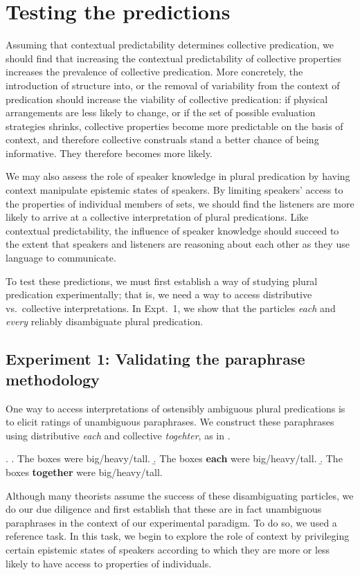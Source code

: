 \documentclass[linguex]{sp}
\begin{document}
\section{Testing the predictions}

Assuming that contextual predictability determines collective predication, we should find that increasing the contextual predictability of collective properties increases the prevalence of collective predication. More concretely, the introduction of structure into, or the removal of variability from the context of predication should increase the viability of collective predication: if physical arrangements are less likely to change, or if the set of possible evaluation strategies shrinks, collective properties become more predictable on the basis of context, and therefore collective construals stand a better chance of being informative. They therefore becomes more likely. 

We may also assess the role of speaker knowledge in plural predication by having context manipulate epistemic states of speakers. By limiting speakers' access to the properties of individual members of sets, we should find the listeners are more likely to arrive at a collective interpretation of plural predications. Like contextual predictability, the influence of speaker knowledge should succeed to the extent that speakers and listeners are reasoning about each other as they use language to communicate.

To test these predictions, we must first establish a way of studying plural predication experimentally; that is, we need a way to access distributive vs.~collective interpretations. In Expt.~1, we show that the particles \emph{each} and \emph{every} reliably disambiguate plural predication.


\subsection{Experiment 1: Validating the paraphrase methodology}

One way to access interpretations of ostensibly ambiguous plural predications is to elicit ratings of unambiguous paraphrases. We construct these paraphrases using distributive \emph{each} and collective \emph{togehter}, as in \Next.

\ex. \a. The boxes were big/heavy/tall.
\b.\label{each} The boxes \textbf{each} were big/heavy/tall.
\b.\label{together} The boxes \textbf{together} were big/heavy/tall.

Although many theorists assume the success of these disambiguating particles, we do our due diligence and first establish that these are in fact unambiguous paraphrases in the context of our experimental paradigm. To do so, we used a reference task. In this task, we begin to explore the role of context by privileging certain epistemic states of speakers according to which they are more or less likely to have access to properties of individuals.
\end{document}
